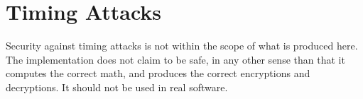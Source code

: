 \section{Timing Attacks}

Security against timing attacks is not within the scope of what is produced here. The implementation
does not claim to be safe, in any other sense than that it computes the correct math, and produces
the correct encryptions and decryptions. It should not be used in real software.
